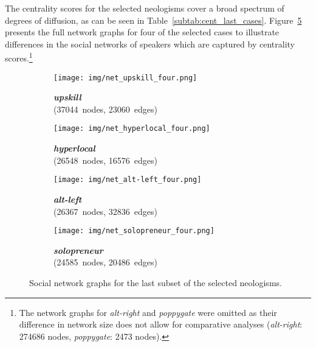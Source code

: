 \documentclass[
  a4paper,
  abstract=on,
  captions=tableabove,
  ]{scrartcl}
\newcommand{\ol}[1]{\emph{#1}}
\newcommand{\se}[1]{\textbf{#1}}
\begin{document}
      The centrality scores for the selected neologisms cover a broad spectrum of degrees of diffusion, as can be seen in Table~\ref{subtab:cent_last_cases}. Figure~\ref{fig:net_last_cases} presents the full network graphs for four of the selected cases to illustrate differences in the social networks of speakers which are captured by centrality scores.\footnote{The network graphs for \ol{alt-right} and \ol{poppygate} were omitted as their difference in network size does not allow for comparative analyses (\ol{alt-right}: \num{274686} nodes, \ol{poppygate}: \num{2473} nodes).}  

      \begin{figure}
        \centering
        \begin{subfigure}{.45\linewidth}
          \caption{\se{\ol{upskill}}\\ (\num{37044}~nodes, \num{23060}~edges)}
          \label{subfig:net_last_cases_upskill}
          \texttt{[image: img/net\_upskill\_four.png]}
        \end{subfigure}
        \begin{subfigure}{.45\linewidth}
          \caption{\se{\ol{hyperlocal}}\\ (\num{26548}~nodes, \num{16576}~edges)}
          \label{subfig:net_last_cases_hyperlocal}
          \texttt{[image: img/net\_hyperlocal\_four.png]}
        \end{subfigure}

        \begin{subfigure}{.45\linewidth}
          \caption{\se{\ol{alt-left}}\\ (\num{26367}~nodes, \num{32836}~edges)}
          \label{subfig:net_last_cases_alt-left}
          \texttt{[image: img/net\_alt-left\_four.png]}
        \end{subfigure}
        \begin{subfigure}{.45\linewidth}
          \caption{\se{\ol{solopreneur}}\\ (\num{24585}~nodes, \num{20486}~edges)}
          \label{subfig:net_last_cases_solopreneur}
          \texttt{[image: img/net\_solopreneur\_four.png]}
        \end{subfigure}
        \captionsetup[subfigure]{justification=centering}
        \caption[Social networks of diffusion for the selected neologisms]{Social network graphs for the last subset of the selected neologisms.}
        \label{fig:net_last_cases}
      \end{figure}
\end{document}
